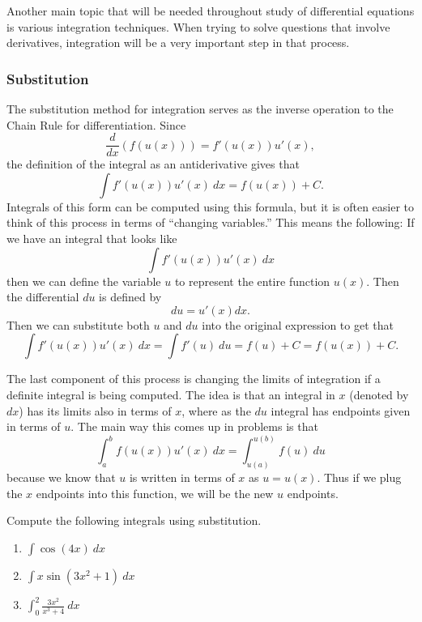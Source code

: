 Another main topic that will be needed throughout study of differential equations is various integration techniques. When trying to solve questions that involve derivatives, integration will be a very important step in that process.

\subsubsection{Substitution}

The substitution method for integration serves as the inverse operation to the Chain Rule for differentiation. Since \[ \frac{d}{dx}(f(u(x))) = f'(u(x))u'(x), \] the definition of the integral as an antiderivative gives that
\[ \int f'(u(x))u'(x)\ dx = f(u(x)) + C.\] Integrals of this form can be computed using this formula, but it is often easier to think of this process in terms of ``changing variables.'' This means the following: If we have an integral that looks like 
\[ \int f'(u(x))u'(x)\ dx \] then we can define the variable $u$ to represent the entire function $u(x)$. Then the differential $du$ is defined by 
\[ du = u'(x) dx. \] Then we can substitute both $u$ and $du$ into the original expression to get that 
\[ \int f'(u(x))u'(x)\ dx = \int f'(u)\ du = f(u) + C = f(u(x)) + C. \]

The last component of this process is changing the limits of integration if a definite integral is being computed. The idea is that an integral in $x$ (denoted by $dx$) has its limits also in terms of $x$, where as the $du$ integral has endpoints given in terms of $u$. The main way this comes up in problems is that
\[ \int_a^b f(u(x))u'(x)\ dx = \int_{u(a)}^{u(b)} f(u)\ du \] because we know that $u$ is written in terms of $x$ as $u = u(x)$. Thus if we plug the $x$ endpoints into this function, we will be the new $u$ endpoints.

\begin{example}
Compute the following integrals using substitution.
\begin{enumerate}
\item $\displaystyle \int \cos(4x)\ dx$
\item $\displaystyle \int x\sin(3x^2 + 1)\ dx$
\item $\displaystyle \int_0^2 \frac{3x^2}{x^3 + 4}\ dx$ 
\end{enumerate}
\end{example}

